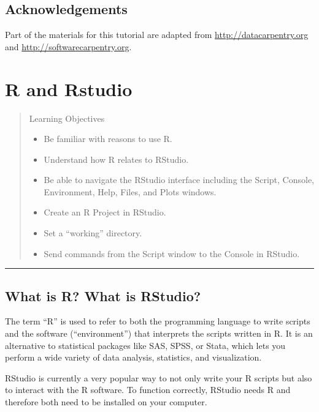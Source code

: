 \documentclass[]{book}
\providecommand{\tightlist}{%
  \setlength{\itemsep}{0pt}\setlength{\parskip}{0pt}}
\theoremstyle{definition}
\theoremstyle{definition}
\theoremstyle{definition}
\theoremstyle{remark}
\begin{document}
\section*{Acknowledgements}\label{acknowledgements}

Part of the materials for this tutorial are adapted from
\url{http://datacarpentry.org} and \url{http://softwarecarpentry.org}.

\chapter{R and Rstudio}\label{backgroud}

\begin{quote}
Learning Objectives

\begin{itemize}
\tightlist
\item
  Be familiar with reasons to use R.
\item
  Understand how R relates to RStudio.
\item
  Be able to navigate the RStudio interface including the Script,
  Console, Environment, Help, Files, and Plots windows.
\item
  Create an R Project in RStudio.
\item
  Set a ``working'' directory.
\item
  Send commands from the Script window to the Console in RStudio.
\end{itemize}
\end{quote}

\begin{center}\rule{0.5\linewidth}{\linethickness}\end{center}

\section{What is R? What is RStudio?}\label{what-is-r-what-is-rstudio}

The term ``R'' is used to refer to both the programming language to
write scripts and the software (``environment'') that interprets the
scripts written in R. It is an alternative to statistical packages like
SAS, SPSS, or Stata, which lets you perform a wide variety of data
analysis, statistics, and visualization.

RStudio is currently a very popular way to not only write your R scripts
but also to interact with the R software. To function correctly, RStudio
needs R and therefore both need to be installed on your computer.
\end{document}

